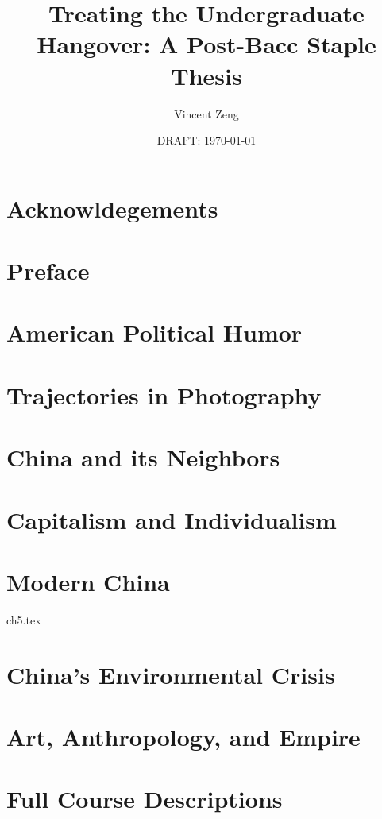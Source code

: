 \documentclass{book}[10pt]
\title{Treating the Undergraduate Hangover: A Post-Bacc Staple Thesis}
\author{Vincent Zeng}
\date{DRAFT: \today}
\begin{document}
\maketitle



\frontmatter
\chapter{Acknowldegements}


\tableofcontents

\chapter{Preface}



\mainmatter

\chapter{American Political Humor}


\chapter{Trajectories in Photography}


\chapter{China and its Neighbors}


\chapter{Capitalism and Individualism}


\chapter{Modern China}
 {ch5.tex}

\chapter{China's Environmental Crisis}


\chapter{Art, Anthropology, and Empire}


\appendix

\chapter{Full Course Descriptions}


\printindex
\end{document}
